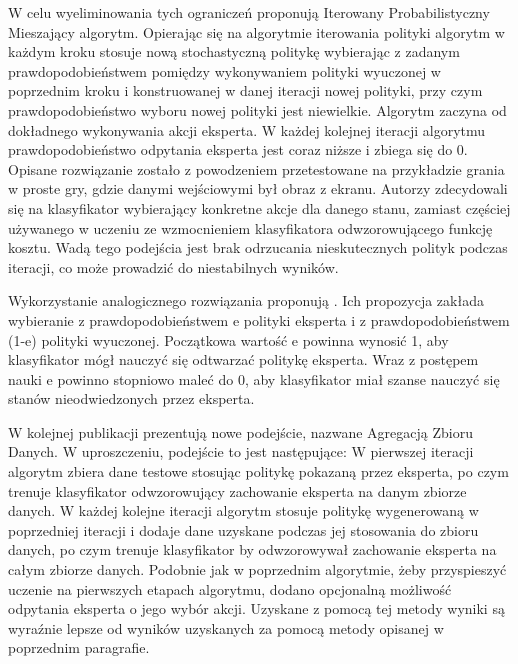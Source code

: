 W celu wyeliminowania tych ograniczeń \cite{DBLP:journals/corr/abs-1011-0686} proponują Iterowany Probabilistyczny Mieszający algorytm. Opierając się na algorytmie iterowania polityki algorytm w każdym kroku stosuje nową stochastyczną politykę wybierając z zadanym prawdopodobieństwem pomiędzy wykonywaniem polityki wyuczonej w poprzednim kroku i konstruowanej w danej iteracji nowej polityki, przy czym prawdopodobieństwo wyboru nowej polityki jest niewielkie. Algorytm zaczyna od dokładnego wykonywania akcji eksperta. W każdej kolejnej iteracji algorytmu prawdopodobieństwo odpytania eksperta jest coraz niższe i zbiega się do 0. Opisane rozwiązanie zostało z powodzeniem przetestowane na przykładzie grania w proste gry, gdzie danymi wejściowymi był obraz z ekranu. Autorzy zdecydowali się na klasyfikator wybierający konkretne akcje dla danego stanu, zamiast częściej używanego w uczeniu ze wzmocnieniem klasyfikatora odwzorowującego funkcję kosztu. Wadą tego podejścia jest brak odrzucania nieskutecznych polityk podczas iteracji, co może prowadzić do niestabilnych wyników.

Wykorzystanie analogicznego rozwiązania proponują \cite{DBLP:journals/corr/BengioVJS15}. Ich propozycja zakłada wybieranie z prawdopodobieństwem e polityki eksperta i z prawdopodobieństwem (1-e) polityki wyuczonej. Początkowa wartość e powinna wynosić 1, aby klasyfikator mógł nauczyć się  odtwarzać politykę eksperta. Wraz z postępem nauki e powinno stopniowo maleć do 0, aby klasyfikator miał szanse nauczyć się stanów nieodwiedzonych przez eksperta.

W kolejnej publikacji \cite{DBLP:journals/corr/abs-1011-0686} prezentują nowe podejście, nazwane Agregacją Zbioru Danych. W uproszczeniu, podejście to jest następujące: W pierwszej iteracji algorytm zbiera dane testowe stosując politykę pokazaną przez eksperta, po czym trenuje klasyfikator odwzorowujący zachowanie eksperta na danym zbiorze danych. W każdej kolejne iteracji algorytm stosuje politykę wygenerowaną w poprzedniej iteracji i dodaje dane uzyskane podczas jej stosowania do zbioru danych, po czym trenuje klasyfikator by odwzorowywał zachowanie eksperta na całym zbiorze danych. Podobnie jak w poprzednim algorytmie, żeby przyspieszyć uczenie na pierwszych etapach algorytmu, dodano opcjonalną możliwość odpytania eksperta o jego wybór akcji. Uzyskane z pomocą tej metody wyniki są wyraźnie lepsze od wyników uzyskanych za pomocą metody opisanej w poprzednim paragrafie.

